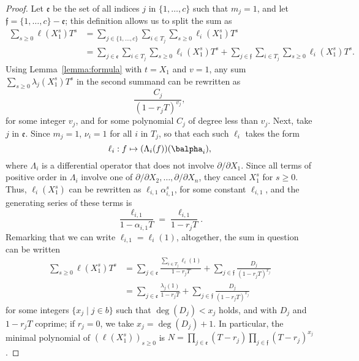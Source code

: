 \documentclass[12pt]{article}
\begin{document}
\begin{proof}
	Let $\mathfrak{e}$ be the set of all indices $j$ in $\{1,\dots,c\}$
	such that $m_j=1$, and let $\mathfrak{f}=\{1,\dots,c\}-\mathfrak{e}$;
	this definition allows us to split the sum as
	\begin{align*}
	\sum_{s \ge 0} \ell(X_1^s) T^s  
	&= \sum_{j \in \{1,\dots,c\}}\sum_{i\in T_j} 
	\sum_{s \ge 0}\ell_i(X_1^s)T^s  \\
	&=\sum_{j \in \mathfrak{e}}\sum_{i\in T_j}\sum_{s \ge 0}  \ell_i(X_1^s)T^s +
	\sum_{j \in \mathfrak{f}}\sum_{i\in T_j}\sum_{s \ge 0}  \ell_i(X_1^s)T^s.
	\end{align*}
	Using Lemma~\ref{lemma:formula} with $t=X_1$ and $v=1$, any sum $\sum_{s \ge 0} \lambda_j(X_1^s)T^s$ 
	in the second summand
	can be rewritten as 
	$$\frac{C_j}{(1-r_j T)^{v_j}},$$
	for some integer $v_j$, and for some polynomial $C_j$ of degree less than
	$v_j$. Next, take $j$ in $\mathfrak{e}$. Since $m_j=1$, $\nu_i=1$ for all $i$ in $T_j$,
	so that
	each such $\ell_i$ takes the form 
	$$\ell_i: f \mapsto (\Lambda_{i}(f))(\balpha_i),$$ where $\Lambda_{i}$
	is a differential operator that does not involve $\partial/\partial
	X_1$. Since all terms of positive order in $\Lambda_i$ involve one of
	$\partial/\partial X_2,\dots,\partial/\partial X_n$, they cancel
	$X_1^s$ for $s\ge 0$. Thus, $\ell_i(X_1^s)$ can be rewritten 
	as $\ell_{i,1} \alpha_{i,1}^s$, for some constant $\ell_{i,1}$,
	and the generating series of these terms is 
	$$\frac {\ell_{i,1}}{1-\alpha_{i,1}T}=\frac {\ell_{i,1}}{1-r_j T}.$$
	Remarking  that we can write $\ell_{i,1}=\ell_i(1)$,
	altogether, the sum in question can be written
	\begin{align*}
	\sum_{s \ge 0} \ell(X_1^s) T^s  
	&=\sum_{j \in \mathfrak{e}} 
	\frac{ \sum_{i\in T_j}  \ell_{i}(1) }{1-r_j T}
	+ \sum_{j \in \mathfrak{f}} \frac{D_j}{(1-r_j T)^{x_j}}\\
	&= \sum_{j \in \mathfrak{e}} 
	\frac{ \lambda_j(1) }{1-r_j T}
	+ \sum_{j \in \mathfrak{f}} \frac{D_j}{(1-r_j T)^{x_j}}
	\end{align*}
	for some integers $\{x_j \mid j \in b\}$ such that $\deg(D_j) < x_j$
	holds, and with $D_j$ and $1-r_j T$ coprime; if $r_j=0$, we take
	$x_j=\deg(D_j)+1$. In particular, the minimal polynomial of
	$(\ell(X_1^s))_{s\ge 0}$ is $N=\prod_{j\in \mathfrak{e}}(T-r_j)
	\prod_{j \in \mathfrak{f}}(T-r_j)^{x_j}$.
	

\end{proof}
\end{document}
